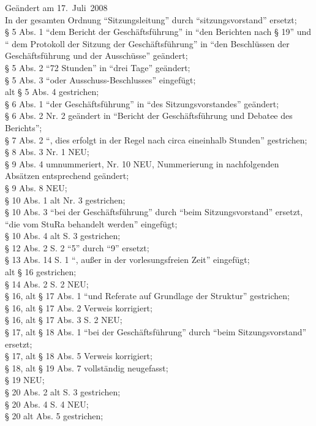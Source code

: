 Geändert am 17.~Juli~2008\\
In der gesamten Ordnung "`Sitzungsleitung"' durch "`sitzungsvorstand"' ersetzt;\\
§ 5 Abs. 1 "`dem Bericht der Geschäftsführung"' in "`den Berichten nach § 19"' und "` dem Protokoll der Sitzung der Geschäftsführung"' in "`den Beschlüssen der Geschäftsführung und der Ausschüsse"' geändert;\\
§ 5 Abs. 2 "`72 Stunden"' in "`drei Tage"' geändert;\\
§ 5 Abs. 3 "`oder Ausschuss-Beschlusses"' eingefügt;\\
alt § 5 Abs. 4 gestrichen;\\
§ 6 Abs. 1 "`der Geschäftsführung"' in "`des Sitzungsvorstandes"' geändert;\\
§ 6 Abs. 2 Nr. 2 geändert in "`Bericht der Geschäftsführung und Debatee des Berichts"';\\
§ 7 Abs. 2 "`, dies erfolgt in der Regel nach circa eineinhalb Stunden"' gestrichen;\\
§ 8 Abs. 3 Nr. 1 NEU;\\
§ 9 Abs. 4 umnummeriert, Nr. 10 NEU, Nummerierung in nachfolgenden Absätzen entsprechend geändert;\\
§ 9 Abs. 8 NEU;\\
§ 10 Abs. 1 alt Nr. 3 gestrichen;\\
§ 10 Abs. 3 "`bei der Geschäftsführung"' durch "`beim Sitzungsvorstand"' ersetzt, "`die vom StuRa behandelt werden"' eingefügt;\\
§ 10 Abs. 4 alt S. 3 gestrichen;\\
§ 12 Abs. 2 S. 2 "`5"' durch "`9"' ersetzt;\\
§ 13 Abs. 14 S. 1 "`, außer in der vorlesungsfreien Zeit"' eingefügt;\\
alt § 16 gestrichen;\\
§ 14 Abs. 2 S. 2 NEU;\\
§ 16, alt § 17 Abs. 1 "`und Referate auf Grundlage der Struktur"' gestrichen;\\
§ 16, alt § 17 Abs. 2 Verweis korrigiert;\\
§ 16, alt § 17 Abs. 3 S. 2 NEU;\\
§ 17, alt § 18 Abs. 1 "`bei der Geschäftsführung"' durch "`beim Sitzungsvorstand"' ersetzt;\\
§ 17, alt § 18 Abs. 5 Verweis korrigiert;\\
§ 18, alt § 19 Abs. 7 vollständig neugefasst;\\
§ 19 NEU;\\
§ 20 Abs. 2 alt S. 3 gestrichen;\\
§ 20 Abs. 4 S. 4 NEU;\\
§ 20 alt Abs. 5 gestrichen;\\

